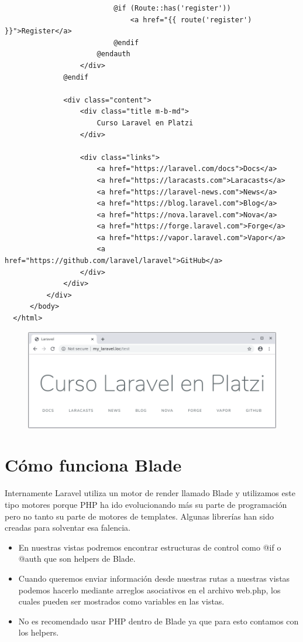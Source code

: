 \documentclass{article}
\begin{document}
\begin{verbatim}
                          @if (Route::has('register'))
                              <a href="{{ route('register') }}">Register</a>
                          @endif
                      @endauth
                  </div>
              @endif

              <div class="content">
                  <div class="title m-b-md">
                      Curso Laravel en Platzi
                  </div>

                  <div class="links">
                      <a href="https://laravel.com/docs">Docs</a>
                      <a href="https://laracasts.com">Laracasts</a>
                      <a href="https://laravel-news.com">News</a>
                      <a href="https://blog.laravel.com">Blog</a>
                      <a href="https://nova.laravel.com">Nova</a>
                      <a href="https://forge.laravel.com">Forge</a>
                      <a href="https://vapor.laravel.com">Vapor</a>
                      <a href="https://github.com/laravel/laravel">GitHub</a>
                  </div>
              </div>
          </div>
      </body>
  </html>
\end{verbatim}

\begin{figure}[h!]
  \centering
  \includegraphics[scale=0.5]{./Pictures/007_test_vistas.png}
\end{figure}


\section{Cómo funciona Blade}%
Internamente Laravel utiliza un motor de render llamado Blade y utilizamos este
tipo motores porque PHP ha ido evolucionando más su parte de programación pero
no tanto su parte de motores de templates. Algunas librerías han sido creadas
para solventar esa falencia.\\

\begin{itemize}
  \item En nuestras vistas podremos encontrar estructuras de control como @if o
    @auth que son helpers de Blade.
  \item Cuando queremos enviar información desde nuestras rutas a nuestras
    vistas podemos hacerlo mediante arreglos asociativos en el archivo web.php,
    los cuales pueden ser mostrados como variables en las vistas.
  \item No es recomendado usar PHP dentro de Blade ya que para esto contamos
    con los helpers.
\end{itemize}
\end{document}
